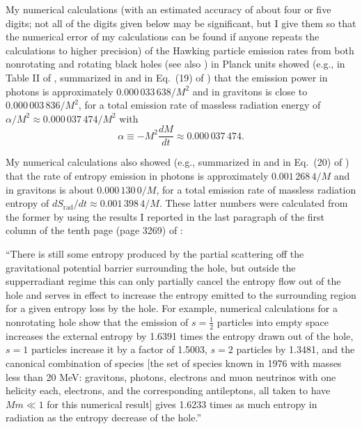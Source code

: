 \documentclass[12pt]{article}
\begin{document}
My numerical calculations (with an estimated accuracy of about four or five digits; not all of the digits given below may be significant, but I give them so that the numerical error of my calculations can be found if anyone repeats the calculations to higher precision) of the Hawking particle emission rates from both nonrotating and rotating black holes \cite{Page:1976df,Page:1976ki,Page:1977um} (see also \cite{Zurek:1982zz,Page:1983ug,Page:2006my}) in Planck units showed (e.g., in Table II of \cite{Page:1976ki}, summarized in \cite{Page:1983ug} and in Eq.\ (19) of \cite{Page:2006my}) that the emission power in photons is approximately $0.000\,033\,638/M^2$ and in gravitons is close to $0.000\,003\,836/M^2$, for a total emission rate of massless radiation energy of $\alpha/M^2 \approx 0.000\,037\,474/M^2$ with
\begin{equation}
\alpha \equiv -M^2\frac{dM}{dt} \approx 0.000\,037\,474.
\label{power-coefficient}
\end{equation}

My numerical calculations also showed (e.g., summarized in \cite{Page:1983ug} and in Eq.\ (20) of \cite{Page:2006my}) that the rate of entropy emission in photons is approximately $0.001\,268\,4/M$ and in gravitons is about $0.000\,130\,0/M$, for a total emission rate of massless radiation entropy of $dS_\mathrm{rad}/dt \approx 0.001\,398\,4/M$.  These latter numbers were calculated from the former by using the results I reported in the last paragraph of the first column of the tenth page (page 3269) of \cite{Page:1976ki}:

``There is still some entropy produced by the partial scattering off the gravitational potential barrier surrounding the hole, but outside the supperradiant regime this can only partially cancel the entropy flow out of the hole and serves in effect to increase the entropy emitted to the surrounding region for a given entropy loss by the hole.  For example, numerical calculations for a nonrotating hole show that the emission of $s = \frac{1}{2}$ particles into empty space increases the external entropy by 1.6391 times the entropy drawn out of the hole, $s = 1$ particles increase it by a factor of 1.5003, $s = 2$ particles by 1.3481, and the canonical combination of species [the set of species known in 1976 with masses less than 20 MeV: gravitons, photons, electrons and muon neutrinos with one helicity each, electrons, and the corresponding antileptons, all taken to have $Mm \ll 1$ for this numerical result] gives 1.6233 times as much entropy in radiation as the entropy decrease of the hole.''
\end{document}
